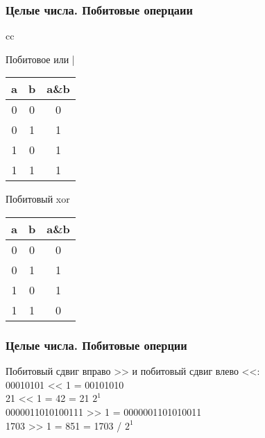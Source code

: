 \begin{frame}
    \frametitle{Целые числа. Побитовые оперцаии}

    \begin{tabular}{cc}
        \begin{minipage}{.5\linewidth}
            \begin{table}[h!]
                Побитовое или | \\
                \begin{tabular}{|c|c|c|}
                    \hline
                    a & b & a\&b \\[0.5ex]
                    \hline\hline
                    0 & 0 & 0  \\
                    0 & 1 & 1  \\
                    1 & 0 & 1  \\
                    1 & 1 & 1  \\
                    \hline
                \end{tabular}
            \end{table}
        \end{minipage}

        \begin{minipage}{.4\linewidth}
            \begin{table}[h!]
                Побитовый xor \^ \\
                \begin{tabular}{|c|c|c|}
                    \hline
                    a & b & a\&b \\[0.5ex]
                    \hline\hline
                    0 & 0 & 0  \\
                    0 & 1 & 1  \\
                    1 & 0 & 1  \\
                    1 & 1 & 0  \\
                    \hline
                \end{tabular}
            \end{table}
        \end{minipage}
    \end{tabular}
\end{frame}


\begin{frame}
    \frametitle{Целые числа. Побитовые оперции}

    \begin{center}
        Побитовый сдвиг вправо >> и побитовый сдвиг влево <<: \\
        00010101 << 1 = 00101010 \\
        21 << 1 = 42 = 21 \times $2^1$ \\
        0000011010100111 >> 1 = 0000001101010011 \\
        1703 >> 1 = 851 = 1703 / $2^1$ \\
    \end{center}

\end{frame}

